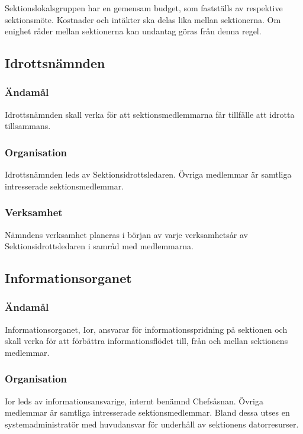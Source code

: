 \documentclass{dgovdoc}
\begin{document}
Sektionslokalsgruppen har en gemensam budget, som fastställs av respektive
sektionsmöte. Kostnader och intäkter ska delas lika mellan sektionerna. Om
enighet råder mellan sektionerna kan undantag göras från denna regel.

\subsection{Idrottsnämnden}

\subsubsection{Ändamål}

Idrottsnämnden skall verka för att sektionsmedlemmarna får tillfälle att
idrotta tillsammans.

\subsubsection{Organisation}

Idrottsnämnden leds av Sektionsidrottsledaren. Övriga medlemmar är samtliga
intresserade sektionsmedlemmar.

\subsubsection{Verksamhet}

Nämndens verksamhet planeras i början av varje verksamhetsår av
Sektionsidrottsledaren i samråd med medlemmarna.

\subsection{Informationsorganet}

\subsubsection{Ändamål}

Informationsorganet, Ior, ansvarar för informationsspridning på sektionen och
skall verka för att förbättra informationsflödet till, från och mellan
sektionens medlemmar.

\subsubsection{Organisation}

Ior leds av informationsansvarige, internt benämnd Chefsåsnan. Övriga medlemmar
är samtliga intresserade sektionsmedlemmar. Bland dessa utses en
systemadministratör med huvudansvar för underhåll av sektionens datorresurser.
\end{document}
